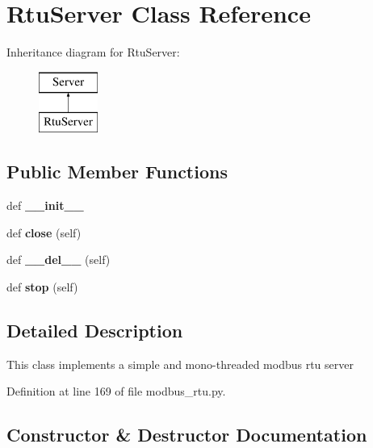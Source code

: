 \section{Rtu\+Server Class Reference}
\label{classprotolibs_1_1modbus__tk_1_1modbus__rtu_1_1_rtu_server}
Inheritance diagram for Rtu\+Server\+:\begin{figure}[H]
\begin{center}
\leavevmode
\includegraphics[height=2.000000cm]{classprotolibs_1_1modbus__tk_1_1modbus__rtu_1_1_rtu_server}
\end{center}
\end{figure}
\subsection*{Public Member Functions}
\begin{DoxyCompactItemize}
\item 
def {\bf \+\_\+\+\_\+init\+\_\+\+\_\+}
\item 
def {\bf close} (self)
\item 
def {\bf \+\_\+\+\_\+del\+\_\+\+\_\+} (self)
\item 
def {\bf stop} (self)
\end{DoxyCompactItemize}


\subsection{Detailed Description}
\begin{DoxyVerb}This class implements a simple and mono-threaded modbus rtu server\end{DoxyVerb}
 

Definition at line 169 of file modbus\+\_\+rtu.\+py.



\subsection{Constructor \& Destructor Documentation}
